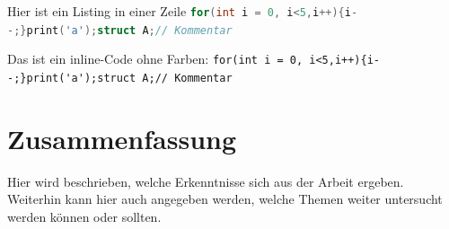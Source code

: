 Hier ist ein Listing in einer Zeile \lstinline[language=C]|for(int i = 0, i<5,i++){i--;}print('a');struct A;// Kommentar|

Das ist ein inline-Code ohne Farben:  \lstinline[]|for(int i = 0, i<5,i++){i--;}print('a');struct A;// Kommentar|

\chapter{Zusammenfassung}

Hier wird beschrieben, welche Erkenntnisse sich aus der Arbeit ergeben.
Weiterhin kann hier auch angegeben werden, welche Themen weiter untersucht
werden können oder sollten.
